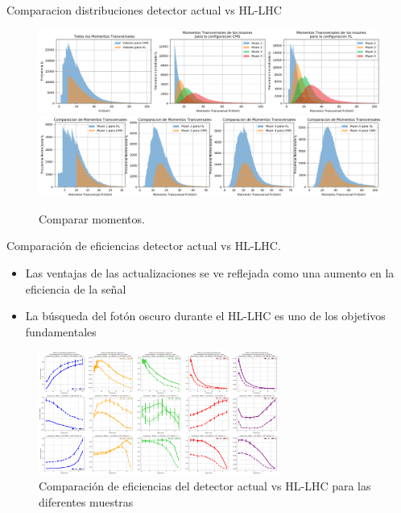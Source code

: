 \begin{frame}{Comparacion distribuciones detector actual vs HL-LHC}
\begin{figure}
\centering
\includegraphics[width=1\textwidth]{Imag/momento1.png}
\includegraphics[width=1\textwidth]{Imag/momento2.png}
\caption{Comparar momentos.}
\end{figure}  
\end{frame}



\begin{frame}{Comparaci\'on de eficiencias detector actual vs HL-LHC.}
    
\begin{itemize}
\item Las ventajas de las actualizaciones se ve reflejada como una aumento en la eficiencia de la se\~nal
\item La b\'usqueda del fot\'on oscuro durante el HL-LHC es uno de los objetivos fundamentales
\end{itemize}
    
\begin{figure}[h]
\centering
\includegraphics[width=0.7\textwidth]{Imag/Comparacion_Distribucion_Entries.png}
\caption{Comparaci\'on de eficiencias del detector actual vs HL-LHC para las diferentes muestras}
\end{figure}

\end{frame}


